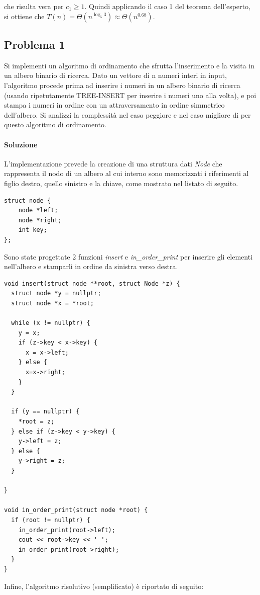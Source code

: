 \documentclass{article}
\begin{document}
che risulta vera per $c_1 \geq 1$. Quindi applicando il caso 1 del teorema dell'esperto, si ottiene che $T(n) = \Theta(n^{\log_5 3}) \approx \Theta(n^{0.68})$.

\clearpage

\subsection{Problema 1}
Si implementi un algoritmo di ordinamento che sfrutta l’inserimento e la visita in un albero
binario di ricerca. Dato un vettore di n numeri interi in input, l’algoritmo procede prima ad inserire i numeri in un albero binario di ricerca (usando ripetutamente TREE-INSERT per
inserire i numeri uno alla volta), e poi stampa i numeri in ordine con un attraversamento in
ordine simmetrico dell’albero. Si analizzi la complessità nel caso peggiore e nel caso
migliore di per questo algoritmo di ordinamento.

\paragraph{Soluzione}
L'implementazione prevede la creazione di una struttura dati \textit{Node} che rappresenta il nodo di un albero al cui interno sono memorizzati i riferimenti al figlio destro, quello sinistro e la chiave, come mostrato nel listato di seguito.

\begin{lstlisting}[caption={Nodo di un albero binario di ricerca},captionpos=b]
struct node {
    node *left;
    node *right;
    int key;
};

\end{lstlisting}
Sono state progettate 2 funzioni \textit{insert} e \textit{in\_order\_print} per inserire gli elementi nell'albero e stamparli in ordine da sinistra verso destra.

\begin{lstlisting}[caption={Procedura di inserimento in un BST},captionpos=b]
void insert(struct node **root, struct Node *z) {
  struct node *y = nullptr;
  struct node *x = *root;

  while (x != nullptr) {
    y = x;
    if (z->key < x->key) {
      x = x->left;
    } else {
      x=x->right;
    }
  }

  if (y == nullptr) {
    *root = z;
  } else if (z->key < y->key) {
    y->left = z;
  } else {
    y->right = z;
  }

}

void in_order_print(struct node *root) {
  if (root != nullptr) {
    in_order_print(root->left);
    cout << root->key << ' ';
    in_order_print(root->right);
  }
}

\end{lstlisting}
Infine, l'algoritmo risolutivo (semplificato) è riportato di seguito:
\end{document}
